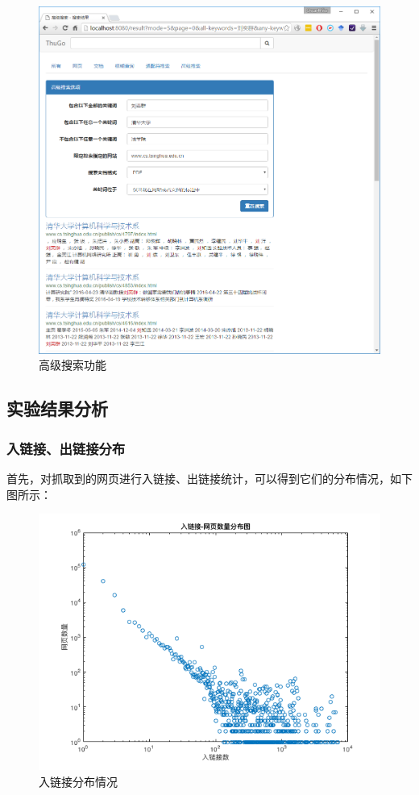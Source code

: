 \documentclass[paper=a4, fontsize=11pt, UTF8]{article} %
\numberwithin{equation}{section} %
\numberwithin{figure}{section} %
\numberwithin{table}{section} %
\begin{document}
\begin{figure}[htp]
\center
\includegraphics[width=\textwidth]{ss6}
\caption{高级搜索功能} \label{ss6}
\end{figure}

\subsection{实验结果分析}

\subsubsection{入链接、出链接分布}

首先，对抓取到的网页进行入链接、出链接统计，可以得到它们的分布情况，如下图所示：

\begin{figure}[htp]
\center
\includegraphics[scale=0.5]{in_degree}
\caption{入链接分布情况}
\end{figure}
\end{document}
